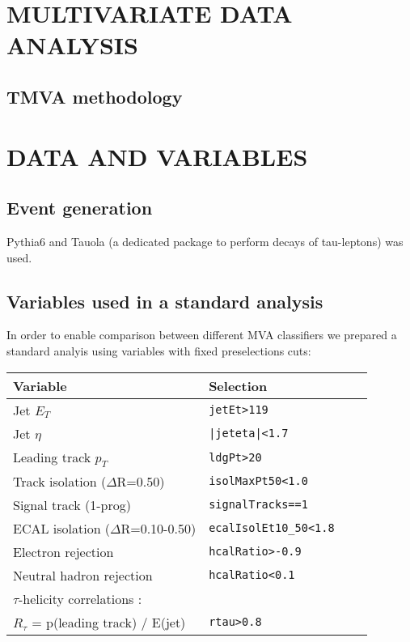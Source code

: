 \documentclass[twoside,floatfix,a4wide]{revtex4}
\begin{document}
\section{MULTIVARIATE DATA ANALYSIS}
\subsection{TMVA methodology}


\section{DATA AND VARIABLES}

\subsection{Event generation}
Pythia6 and Tauola (a dedicated package to perform decays of tau-leptons) was used.
\subsection{Variables used in a standard analysis }

In order to enable comparison between different MVA classifiers 
we prepared a standard
analyis using variables with fixed preselections cuts:

\begin{tabular}{l*{2}{l}r}
\hline
Variable                                    & Selection                  \\
\hline
Jet $E_T$                                   & {\tt jetEt>119}            \\
Jet $\eta$                                  & {\tt |jeteta|<1.7}         \\
Leading track $p_T$                         & {\tt ldgPt>20}             \\
Track isolation ($\Delta$R=0.50)            & {\tt isolMaxPt50<1.0}      \\
Signal track (1-prog)                       & {\tt signalTracks==1}      \\
ECAL isolation ($\Delta$R=0.10-0.50)        & {\tt ecalIsolEt10\_50<1.8} \\
Electron rejection                          & {\tt hcalRatio>-0.9}       \\
Neutral hadron rejection                    & {\tt hcalRatio<0.1}        \\
$\tau$-helicity correlations \cite{roy00a}: &                            \\
$R_{\tau}$ = p(leading track) / E(jet)      & {\tt rtau>0.8}             \\
\hline
\end{tabular}
\end{document}
